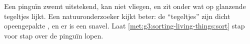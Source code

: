 \begin{exercise}[$\star\star$]\label{exo:g3:sorting-living-things:10}
Een pinguïn zwemt uitstekend, kan niet vliegen, en zit onder wat op
glanzende tegeltjes lijkt. Een natuuronderzoeker kijkt beter: de
``tegeltjes'' zijn dicht opeengepakte , en er is een snavel. Laat
\cref{met:g3:sorting-living-things:sort} stap voor stap over de pinguïn lopen.
\end{exercise}
